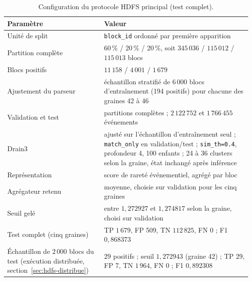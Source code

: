 \begin{table}[H]
\centering
\caption{Configuration du protocole HDFS principal (test complet).}
\label{tab:hdfs-parametres-annexe}
\begin{tabularx}{\textwidth}{p{} X}
\toprule
\textbf{Paramètre} & \textbf{Valeur} \\
\midrule
Unité de split & \texttt{block\_id} ordonné par première apparition \\
Partition complète & 60\,\% / 20\,\% / 20\,\%, soit $345\,036$ / $115\,012$ / $115\,013$ blocs \\
Blocs positifs & $11\,158$ / $4\,001$ / $1\,679$ \\
Ajustement du parseur & échantillon stratifié de $6\,000$ blocs d'entraînement (194 positifs) pour chacune des graines 42 à 46 \\
Validation et test & partitions complètes ; $2\,122\,752$ et $1\,766\,455$ événements \\
Drain3 & ajusté sur l'échantillon d'entraînement seul ; \texttt{match\_only} en validation/test ; \texttt{sim\_th=0.4}, profondeur 4, 100 enfants ; 24 à 36 clusters selon la graine, état inchangé après inférence \\
Représentation & score de rareté événementiel, agrégé par bloc \\
Agrégateur retenu & moyenne, choisie sur validation pour les cinq graines \\
Seuil gelé & entre $1{,}272927$ et $1{,}274817$ selon la graine, choisi sur validation \\
Test complet (cinq graines) & TP $1\,679$, FP 509, TN $112\,825$, FN 0 ; F1 $0{,}868373$ \\
Échantillon de $2\,000$ blocs du test (exécution distribuée, section~\ref{sec:hdfs-distribue}) & 29 positifs ; seuil $1{,}272943$ (graine 42) ; TP 29, FP 7, TN $1\,964$, FN 0 ; F1 $0{,}892308$ \\
\bottomrule
\end{tabularx}
\end{table}
